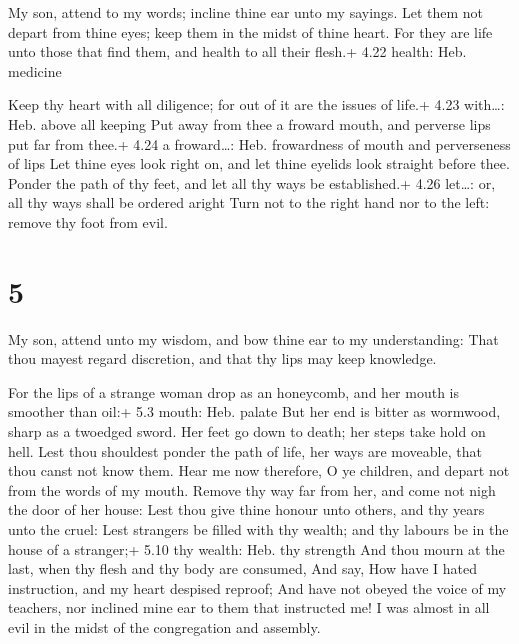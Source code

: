  My son, attend to my words; incline thine ear unto my
sayings.  Let them not depart from thine eyes; keep them in
the midst of thine heart.  For they are life unto those
that find them, and health to all their flesh.+ 4.22 health: Heb.
medicine

 Keep thy heart with all diligence; for out of it are the
issues of life.+ 4.23 with\ldots: Heb. above all keeping 
Put away from thee a froward mouth, and perverse lips put far from
thee.+ 4.24 a froward\ldots: Heb. frowardness of mouth and perverseness
of lips  Let thine eyes look right on, and let thine
eyelids look straight before thee.  Ponder the path of thy
feet, and let all thy ways be established.+ 4.26 let\ldots: or, all thy
ways shall be ordered aright  Turn not to the right hand
nor to the left: remove thy foot from evil.

\hypertarget{section-4}{%
\section{5}\label{section-4}}

 My son, attend unto my wisdom, and bow thine ear to my
understanding:  That thou mayest regard discretion, and that
thy lips may keep knowledge.

 For the lips of a strange woman drop as an honeycomb, and
her mouth is smoother than oil:+ 5.3 mouth: Heb. palate  But
her end is bitter as wormwood, sharp as a twoedged sword. 
Her feet go down to death; her steps take hold on hell. 
Lest thou shouldest ponder the path of life, her ways are moveable, that
thou canst not know them.  Hear me now therefore, O ye
children, and depart not from the words of my mouth.  Remove
thy way far from her, and come not nigh the door of her house:
 Lest thou give thine honour unto others, and thy years unto
the cruel:  Lest strangers be filled with thy wealth; and
thy labours be in the house of a stranger;+ 5.10 thy wealth: Heb. thy
strength  And thou mourn at the last, when thy flesh and
thy body are consumed,  And say, How have I hated
instruction, and my heart despised reproof;  And have not
obeyed the voice of my teachers, nor inclined mine ear to them that
instructed me!  I was almost in all evil in the midst of
the congregation and assembly.

